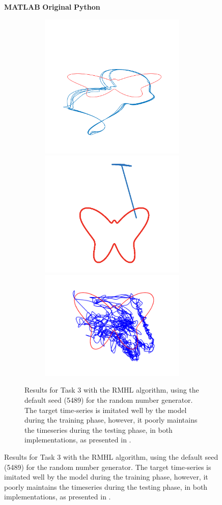 \begin{figure}

    \centering
    \textbf{MATLAB}\hspace{8em}
    \textbf{Original}\hspace{8em}
    \textbf{Python}
    

    \begin{subfigure}{\textwidth}
        \centering
        
        \textbf{}\begin{subfigure}{\textwidth}
        \centering
        
        
        \includegraphics[trim=1.3cm 2cm 1.3cm 2cm, clip=true, height=.25\linewidth]{Figures/MATLAB/RMHL_T3_TimeSeries.png} 
        \hspace{.5em}
        \includegraphics[height=.25\linewidth]{Figures/Orig/RMHL_T3_TimeSeries.png} 
        \hspace{.25em}
        \includegraphics[trim=1.5cm 1.2cm 1.5cm 1.2cm, clip=true,  height=.17\linewidth]{Figures/Python/RMHL_T3_TimeSeries.png}
        
        \end{subfigure}
         
        
        
    \caption{Results for Task 3 with the RMHL algorithm, using the default seed (5489) for the random number generator. The target time‐series is imitated well by the model during the training phase, however, it poorly maintains the timeseries during the testing phase, in both implementations, as presented in \cite{pyle2019}.}
    \label{Fig:compTask3RMHL}
    \end{subfigure}
    

\end{figure}
